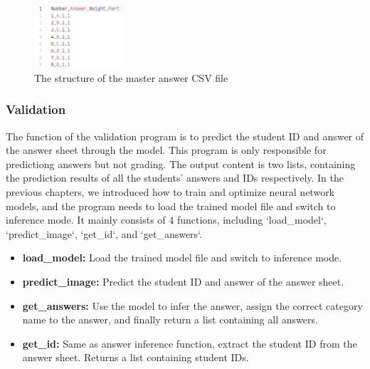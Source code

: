 \documentclass[twocolumn]{article}
\begin{document}
        \begin{figure}[ht]
            \centering
            \includegraphics[width=0.3\textwidth]{master_ans_csv.png}
            \caption{The structure of the master answer CSV file}
            \label{fig:master_ans_csv}
        \end{figure}


        \subsubsection{Validation}

        The function of the validation program is to predict the student ID and answer of the answer sheet through the model. This program is only responsible for predictiong answers but not grading. The output content is two lists, containing the prediction results of all the students' answers and IDs respectively. In the previous chapters, we introduced how to train and optimize neural network models, and the program needs to load the trained model file and switch to inference mode. It mainly consists of 4 functions, including `load\_model`, `predict\_image`, `get\_id`, and `get\_answers`.

        \begin{itemize}
            \item \textbf{load\_model:} Load the trained model file and switch to inference mode.
            \item \textbf{predict\_image:} Predict the student ID and answer of the answer sheet.
            \item \textbf{get\_answers:} Use the model to infer the answer, assign the correct category name to the answer, and finally return a list containing all answers.
            \item \textbf{get\_id:} Same as answer inference function, extract the student ID from the answer sheet. Returns a list containing student IDs.
        \end{itemize}
\end{document}
